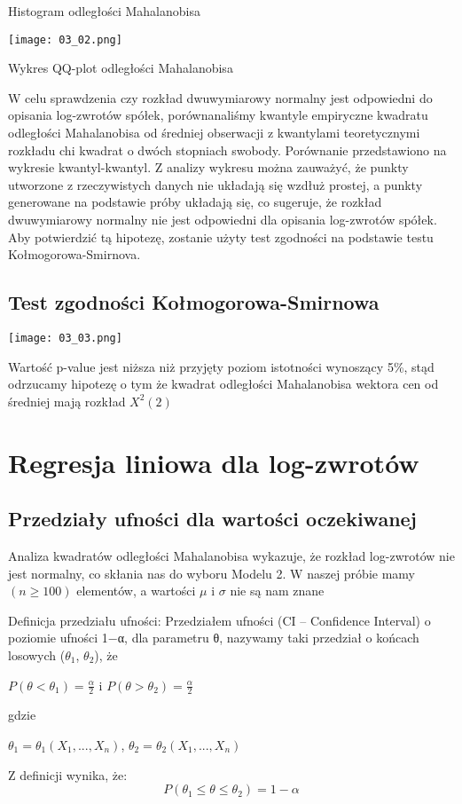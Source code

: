\documentclass[a4paper,11pt]{article}
\def\\{\hfill\break}
\begin{document}
\begin{center}
\centerline{Histogram odległości Mahalanobisa}

\texttt{[image: 03\_02.png]}

\centerline{Wykres QQ-plot odległości Mahalanobisa}

\\
W celu sprawdzenia czy rozkład dwuwymiarowy normalny jest odpowiedni do opisania log-zwrotów spółek, porównanaliśmy kwantyle empiryczne kwadratu odległości Mahalanobisa od średniej obserwacji z kwantylami teoretycznymi rozkładu chi kwadrat o dwóch stopniach swobody. Porównanie przedstawiono na wykresie kwantyl-kwantyl. Z analizy wykresu można zauważyć, że punkty utworzone z rzeczywistych danych nie układają się wzdłuż prostej, a punkty generowane na podstawie próby układają się, co sugeruje, że rozkład dwuwymiarowy normalny nie jest odpowiedni dla opisania log-zwrotów spółek. Aby potwierdzić tą hipotezę, zostanie użyty test zgodności na podstawie testu Kołmogorowa-Smirnova.
\subsection{Test zgodności Kołmogorowa-Smirnowa}
\texttt{[image: 03\_03.png]}

Wartość p-value jest niższa niż przyjęty poziom istotności wynoszący 5\%, stąd odrzucamy hipotezę o tym że kwadrat odległości Mahalanobisa wektora cen od średniej mają rozkład $X^2(2)$

\end{center}
\section{Regresja liniowa dla log-zwrotów}
\subsection{Przedziały ufności dla wartości oczekiwanej}

Analiza kwadratów odległości Mahalanobisa wykazuje, że rozkład log-zwrotów nie jest normalny, co skłania nas do wyboru Modelu 2. W naszej próbie mamy $(n\geqslant100)$ elementów, a wartości $\mu$ i $\sigma $ nie są nam znane

\\Definicja przedziału ufności:
\\Przedziałem ufności (CI – Confidence Interval) o poziomie ufności
1−α, dla parametru θ, nazywamy taki przedział o końcach losowych ($\theta_{1}$, $\theta_{2}$), że
\begin{center}
    $ P(\theta < \theta_{1}) = \frac{\alpha}{2}$ i $P(\theta > \theta_{2}) = \frac{\alpha}{2}$
\end{center}
gdzie 
\begin{center}
    $ \theta_{1} = \theta_{1}(X_{1}, ..., X_{n})$, $\theta_{2} = \theta_{2}(X_{1}, ..., X_{n})$
\end{center}
Z definicji wynika, że: 
$$P(\theta_{1}\leqslant\theta\leqslant\theta_{2}) = 1 - \alpha$$
\end{document}
